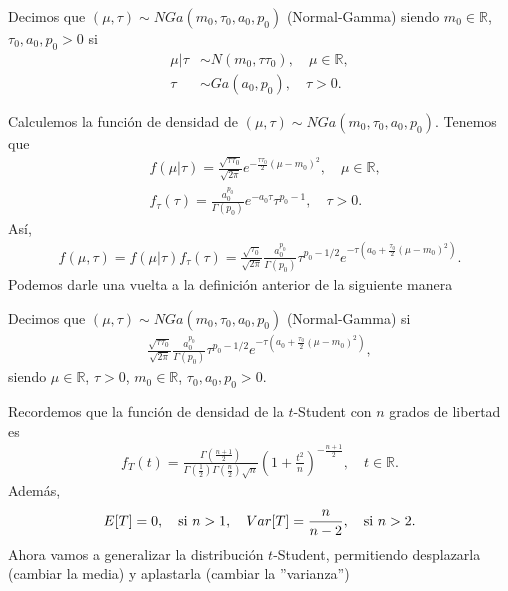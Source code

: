 \begin{defi}
    Decimos que $(\mu, \tau) \sim NGa(m_0, \tau_0, a_0, p_0)$ (Normal-Gamma) siendo $m_0 \in \mathbb{R}$, $\tau_0,a_0,p_0 > 0$ si
    \begin{align*}
        \mu | \tau & \sim N(m_0, \tau \tau_0), \quad \mu \in \mathbb{R}, \\
        \tau       & \sim Ga(a_0,p_0), \quad \tau > 0.
    \end{align*}
\end{defi}
Calculemos la función de densidad de $(\mu, \tau) \sim NGa(m_0, \tau_0, a_0, p_0)$. Tenemos que
\begin{align*}
     & f(\mu | \tau) = \frac{\sqrt{\tau \tau_0}}{\sqrt{2\pi}} e^{- \frac{\tau \tau_0}{2}(\mu - m_0)^2}, \quad \mu \in \mathbb{R}, \\
     & f_{\tau}(\tau) = \frac{a_0^{p_0}}{\Gamma(p_0)} e^{-a_0\tau} \tau^{p_0-1}, \quad \tau > 0.
\end{align*}
Así,
\begin{align*}
    f(\mu,\tau) = f(\mu | \tau) f_{\tau}(\tau) = \frac{\sqrt{ \tau_0}}{\sqrt{2\pi}} \frac{a_0^{p_0}}{\Gamma(p_0)} \tau^{p_0 - 1/2} e^{-\tau\left( a_0 + \frac{\tau_0}{2}(\mu - m_0)^2 \right)}.
\end{align*}
Podemos darle una vuelta a la definición anterior de la siguiente manera
\begin{defi}
    Decimos que $(\mu, \tau) \sim NGa(m_0, \tau_0, a_0, p_0)$ (Normal-Gamma) si
    \begin{align*}
        \frac{\sqrt{\tau \tau_0}}{\sqrt{2\pi}} \frac{a_0^{p_0}}{\Gamma(p_0)} \tau^{p_0 - 1/2} e^{-\tau\left( a_0 + \frac{\tau_0}{2}(\mu - m_0)^2 \right)},
    \end{align*}
    siendo  $\mu \in \mathbb{R}$, $\tau > 0$, $m_0 \in \mathbb{R}$, $\tau_0,a_0,p_0 > 0$.
\end{defi}
Recordemos que la función de densidad de la $t$-Student  con $n$ grados de libertad es
\begin{align*}
    f_T(t) = \frac{\Gamma\left( \frac{n+1}{2} \right)}{\Gamma\left( \frac{1}{2} \right)\Gamma\left( \frac{n}{2} \right)\sqrt{n}} \left(1 + \frac{t^2}{n} \right)^{-\frac{n+1}{2}}, \quad t \in \mathbb{R}.
\end{align*}
Además,
\begin{align*}
    E[T] = 0, \quad \text{si $ n > 1$}, \quad Var[T] = \frac{n}{n-2}, \quad \text{si $n >2$}.
\end{align*}
Ahora vamos a generalizar la distribución $t$-Student, permitiendo desplazarla (cambiar la media) y aplastarla (cambiar la ''varianza'')
